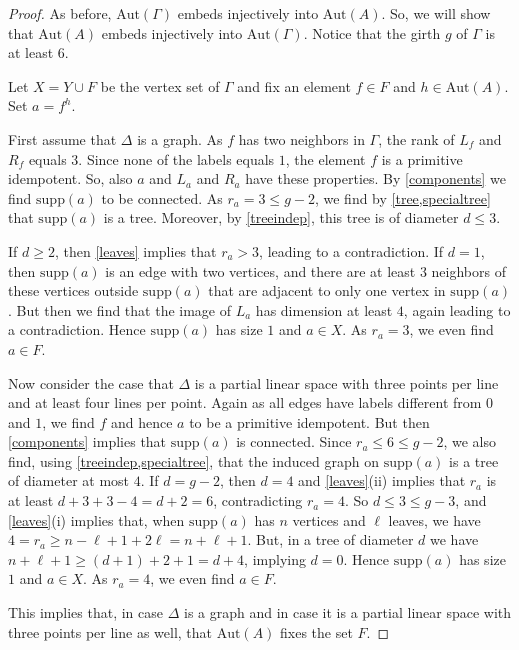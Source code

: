 \documentclass[oneside,a4paper]{amsart} %
\theoremstyle{definition}
\begin{document}
\begin{proof}
As before, $\mathrm{Aut}(\Gamma)$ embeds injectively into $\mathrm{Aut}(A)$. So, we will
show that $\mathrm{Aut}(A)$ embeds injectively into $\mathrm{Aut}(\Gamma)$.
Notice that the girth $g$ of $\Gamma$ is at least $6$.


Let $X=Y\cup F$ be the vertex set of $\Gamma$ and fix an element $f\in F$ and $h\in \mathrm{Aut}(A)$.
Set $a=f^h$.

First assume that $\Delta$ is a graph.
As $f$ has two  neighbors in $\Gamma$, the rank of $L_f$ and $R_f$ equals   $3$.
Since none of the labels equals $1$, the element $f$ is a primitive idempotent. 
So, also $a$ and $L_a$ and $R_a$ have  these properties.
By \cref{components} we find $\mathrm{supp}(a)$ to be connected.
As $r_a=3\leq g-2$, we find by \cref{tree,specialtree} that $ \mathrm{supp}(a)$ is a tree.
Moreover, by \cref{treeindep}, this tree is of diameter $d\leq 3$.

If $d\geq 2$, then \cref{leaves} implies  that $r_a>3$,   leading to a contradiction.
If $d=1$, then $\mathrm{supp}(a)$ is an edge with two vertices, and  there are  at least $3$ neighbors of these vertices outside $\mathrm{supp}(a)$
that are adjacent to only one vertex in $\mathrm{supp}(a)$. But then 
we find that the image of $L_a$ has dimension at least $4$, again leading to a contradiction.
Hence $\mathrm{supp}(a)$ has size $1$ and $a\in X$. As $r_a=3$, we even find $a\in F$.

Now consider the case that $\Delta$ is a partial linear space with three points per line and at least four lines per point.
Again as all edges have labels different from $0$ and $1$, we find $f$ and hence $a$ to be a primitive idempotent. 
But then \cref{components} implies that $\mathrm{supp}(a)$ is connected. 
Since $r_a\leq 6\leq g-2$, we also find, using \cref{treeindep,specialtree}, that the induced graph on $\mathrm{supp}(a)$ is a tree of diameter at most $4$. 
If $d=g-2$, then $d=4$ and \cref{leaves}(ii) implies   that $r_a$ is at least $d+3+3-4=d+2=6$, contradicting $r_a=4$.
So $d\leq 3\leq g-3$, and \cref{leaves}(i) implies that, when $\mathrm{supp}(a)$ has $n$ vertices and $\ell$ leaves, we have 
$4=r_a\geq n-\ell+1+2\ell=n+\ell+1$.
But, in a tree of diameter $d$ we have $n+\ell+1\geq (d+1)+2+1=d+4$, implying $d=0$.
Hence $\mathrm{supp}(a)$ has size $1$ and $a\in X$. As $r_a=4$, we even find $a\in F$.

This implies that, in case $\Delta$ is a graph and in case it is a partial linear space with three points per line as well, that $\mathrm{Aut}(A)$ fixes the set $F$.


\end{proof}
\end{document}

